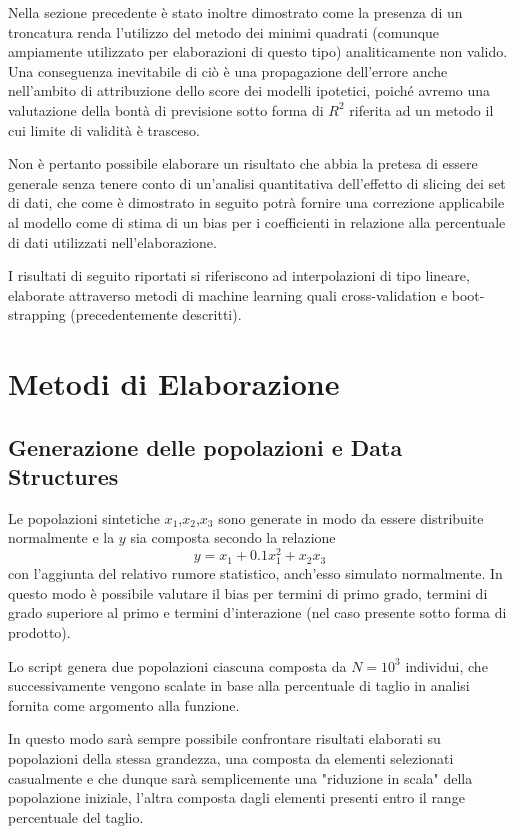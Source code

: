 \documentclass[a4paper]{report}
\begin{document}
Nella sezione precedente è stato inoltre dimostrato come la presenza di un troncatura renda l'utilizzo del metodo dei minimi quadrati (comunque ampiamente utilizzato per elaborazioni di questo tipo) analiticamente non valido. 
Una conseguenza inevitabile di ciò è una propagazione dell'errore anche nell'ambito di attribuzione dello score dei modelli ipotetici, poiché avremo una valutazione della bontà di previsione sotto forma di $R^2$ riferita ad un metodo il cui limite di validità è trasceso.

Non è pertanto possibile elaborare un risultato che abbia la pretesa di essere generale senza tenere conto di un'analisi quantitativa dell'effetto di slicing dei set di dati, che come è dimostrato in seguito potrà fornire una correzione applicabile al modello come di stima di un bias per i coefficienti in relazione alla percentuale di dati utilizzati nell'elaborazione.

I risultati di seguito riportati si riferiscono ad interpolazioni di tipo lineare, elaborate attraverso metodi di machine learning quali cross-validation e boot-strapping (precedentemente descritti).

\section{Metodi di Elaborazione}
\subsection {Generazione delle popolazioni e Data Structures}
Le popolazioni sintetiche $x_1$,$x_2$,$x_3$ sono generate in modo da essere distribuite normalmente e la $y$ sia composta secondo la relazione \[y=x_1+0.1x_1^2+x_2x_3\]con l'aggiunta del relativo rumore statistico, anch'esso simulato normalmente.
In questo modo è possibile valutare il bias per termini di primo grado, termini di grado superiore al primo e termini d'interazione (nel caso presente sotto forma di prodotto).

Lo script genera due popolazioni ciascuna composta da $N=10^3$ individui, che successivamente vengono scalate in base alla percentuale di taglio in analisi fornita come argomento alla funzione.

In questo modo sarà sempre possibile confrontare risultati elaborati su popolazioni della stessa grandezza, una composta da elementi selezionati casualmente e che dunque sarà semplicemente una "riduzione in scala" della popolazione iniziale, l'altra composta dagli elementi presenti entro il range percentuale del taglio.
\end{document}
